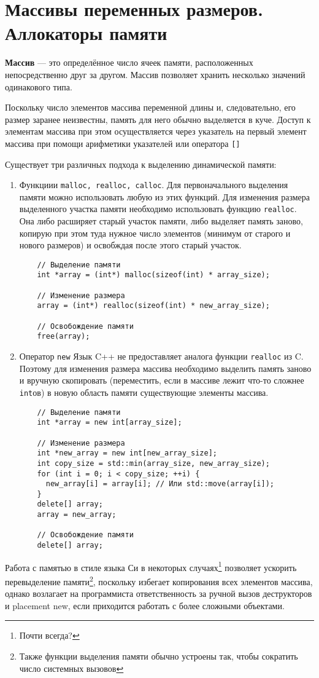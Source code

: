 \documentclass[14pt, a4paper]{extarticle}
\begin{document}
\section{Массивы переменных размеров. Аллокаторы памяти}
\textbf{Массив} — это определённое число ячеек памяти, расположенных непосредственно друг за другом.
Массив позволяет хранить несколько значений одинакового типа.

Поскольку число элементов массива переменной длины и, следовательно, его размер заранее неизвестны,
память для него обычно выделяется в куче. Доступ к элементам массива при этом осуществляется через
указатель на первый элемент массива при помощи арифметики указателей или оператора \verb|[]|

Существует три различных подхода к выделению динамической памяти:
\begin{enumerate}
  \item Функциии \verb|malloc, realloc, calloc|.
  Для первоначального выделения памяти можно использовать любую из этих функций.
  Для изменения размера выделенного участка памяти необходимо использовать 
  функцию \verb|realloc|. Она либо расширяет старый участок памяти, либо выделяет память
  заново, копирую при этом туда нужное число элементов (минимум от старого и нового размеров) и
  освобждая после этого старый участок.

  \begin{verbatim}
    // Выделение памяти
    int *array = (int*) malloc(sizeof(int) * array_size);

    // Изменение размера
    array = (int*) realloc(sizeof(int) * new_array_size);

    // Освобождение памяти
    free(array);
  \end{verbatim}
  
  \item Оператор \verb|new|
  Язык C++ не предоставляет аналога функции \verb|realloc| из C. Поэтому для изменения размера массива
  необходимо выделить память заново и вручную скопировать (переместить, если в массиве лежит что-то сложнее \verb|int|ов)
  в новую область памяти существующие элементы массива.
  \begin{verbatim}
    // Выделение памяти
    int *array = new int[array_size];

    // Изменение размера
    int *new_array = new int[new_array_size];
    int copy_size = std::min(array_size, new_array_size);
    for (int i = 0; i < copy_size; ++i) {
      new_array[i] = array[i]; // Или std::move(array[i]);
    }
    delete[] array;
    array = new_array;

    // Освобождение памяти
    delete[] array;
  \end{verbatim}
\end{enumerate}
Работа с памятью в стиле языка Си в некоторых случаях\footnote{Почти всегда?} позволяет ускорить
перевыделение памяти\footnote{Также функции выделения памяти обычно устроены так, чтобы сократить число системных вызовов},
поскольку избегает копирования всех элементов массива, однако возлагает на программиста
ответственность за ручной вызов деструкторов и placement new, если приходится работать
с более сложными объектами.
\end{document}
